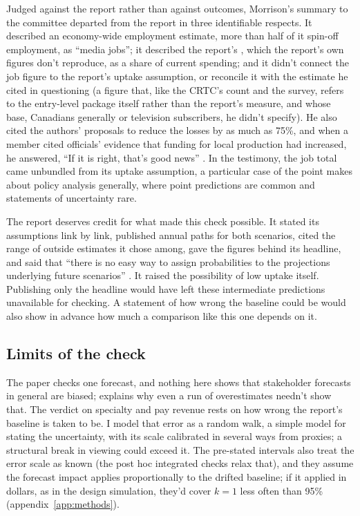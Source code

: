 Judged against the report rather than against outcomes, Morrison's summary to the committee departed from the report in three identifiable respects. It described an economy-wide employment estimate, more than half of it spin-off employment, as \enquote{media jobs}; it described the report's \lttvCPEShareStated{}, which the report's own figures don't reproduce, as a share of current spending; and it didn't connect the job figure to the report's uptake assumption, or reconcile it with the \lttvMorrisonUptake{} estimate he cited in questioning (a figure that, like the CRTC's count and the survey, refers to the entry-level package itself rather than the report's measure, and whose base, Canadians generally or television subscribers, he didn't specify). He also cited the authors' proposals to reduce the losses by as much as 75\%, and when a member cited officials' evidence that funding for local production had increased, he answered, \enquote{If it is right, that's good news} \citep[time marks 0915--0920]{commons2016chpc8}. In the testimony, the job total came unbundled from its uptake assumption, a particular case of the point \textcite[1]{manski2011certitude} makes about policy analysis generally, where point predictions are common and statements of uncertainty rare.

The report deserves credit for what made this check possible. It stated its assumptions link by link, published annual paths for both scenarios, cited the range of outside estimates it chose among, gave the figures behind its headline, and said that \enquote{there is no easy way to assign probabilities to the projections underlying future scenarios} \citep[para.~111]{nordicity2015television}. It raised the possibility of low uptake itself. Publishing only the headline would have left these intermediate predictions unavailable for checking. A statement of how wrong the baseline could be would also show in advance how much a comparison like this one depends on it.

\subsection{Limits of the check}

The paper checks one forecast, and nothing here shows that stakeholder forecasts in general are biased; \textcite[322]{simpson2014overestimate} explains why even a run of overestimates needn't show that. The verdict on specialty and pay revenue rests on how wrong the report's baseline is taken to be. I model that error as a random walk, a simple model for stating the uncertainty, with its scale calibrated in several ways from proxies; a structural break in viewing could exceed it. The pre-stated intervals also treat the error scale as known (the post hoc integrated checks relax that), and they assume the forecast impact applies proportionally to the drifted baseline; if it applied in dollars, as in the design simulation, they'd cover \(k=1\) less often than 95\% (appendix~\ref{app:methods}).

